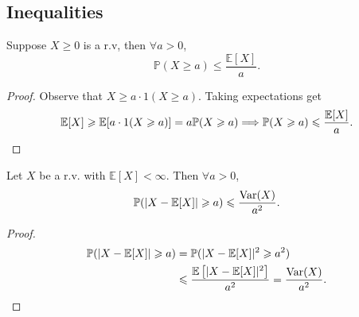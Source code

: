\subsection{Inequalities}
\begin{proposition}\label{prop:Markov's inequality}
    Suppose $ X\ge 0 $ is a r.v, then $ \forall a>0 $, 
    \[
        \mathbb{P}(X\ge a) \le \frac{\mathbb{E}[X]}{a}.
    \]
\end{proposition}
\begin{proof}
    Observe that $ X\ge a \cdot 1(X\ge a) $. Taking expectations get 
    \[
        \mathbb{E}[X]\ge \mathbb{E}[a \cdot 1(X\ge a)] = a \mathbb{P}(X\ge a) \Longrightarrow \mathbb{P}(X\ge a)\le \frac{\mathbb{E}[X]}{a}.\qedhere
    \]
\end{proof}
\begin{proposition}\label{prop:Chebyshev's inequality}
    Let $X$ be a r.v. with $ \mathbb{E}[X]<\infty  $. Then $ \forall a>0 $,
    \[
        \mathbb{P}(|X-\mathbb{E}[X]|\ge a)\le \frac{\var(X)}{a^2}.
    \]
\end{proposition}
\begin{proof}
    \begin{align*}
        \mathbb{P}(|X-\mathbb{E}[X]|\ge a) &= \mathbb{P}(|X-\mathbb{E}[X]|^2\ge a^2)\\ 
        &\le \frac{\mathbb{E}\left[ |X-\mathbb{E}[X]|^2 \right]}{a^2} = \frac{\var(X)}{a^2}.\qedhere
    \end{align*}
\end{proof}

